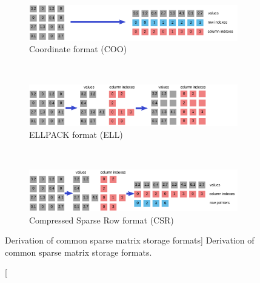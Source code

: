 \begin{figure}[t]
\begin{center}
\begin{minipage}{0.9\columnwidth}
\begin{subfigure}{\columnwidth}
\includegraphics[width=\columnwidth]{plots/coo}
\caption{Coordinate format (COO)}
\end{subfigure} \\[2em]
\begin{subfigure}{\columnwidth}
\includegraphics[width=\columnwidth]{plots/ell}
\caption{ELLPACK format (ELL)}
\end{subfigure} \\[2em]
\begin{subfigure}{\columnwidth}
\includegraphics[width=\columnwidth]{plots/csr}
\caption{Compressed Sparse Row format (CSR)}
\end{subfigure}
\end{minipage}
\end{center}
\caption
[Derivation of common sparse matrix storage formats]
{Derivation of common sparse matrix storage formats.}
\label{introduction:fig:sparse-formats}
\end{figure}


